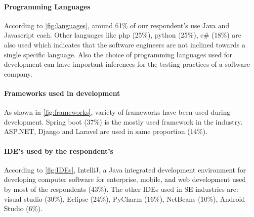 

\paragraph{Programming Languages}
According to \ref{fig:languages}, around 61\% of our respondent's use Java and Javascript each. Other languages like php (25\%), python (25\%), c\# (18\%) are also used which indicates that the software engineers are not inclined towards a single specific language. Also the choice of programming languages used for development can have important inferences for the testing practices of a software company.



\paragraph{Frameworks used in development}
As shown in \ref{fig:frameworks}, variety of frameworks have been used during development. Spring boot (37\%) is the mostly used framework in the industry. ASP.NET, Django and Laravel are used in same proportion (14\%).



\paragraph{IDE's used by the respondent's}
According to \ref{fig:IDEs}, IntelliJ, a Java integrated development environment for developing computer software for enterprise, mobile, and web development used by most of the respondents (43\%). The other IDEs used in SE industries are: visual studio (30\%), Eclipse (24\%), PyCharm (16\%), NetBeans (10\%), Android Studio (6\%).

